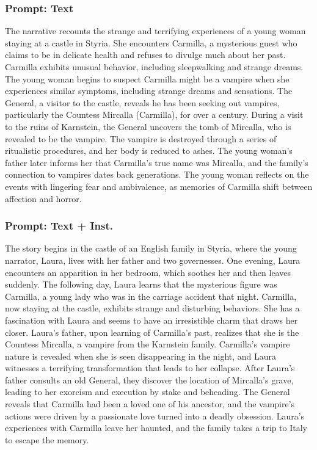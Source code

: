 \documentclass{article} %
\begin{document}
\subsubsection{Prompt: Text}

The narrative recounts the strange and terrifying experiences of a young woman staying at a castle in Styria. She encounters Carmilla, a mysterious guest who claims to be in delicate health and refuses to divulge much about her past. Carmilla exhibits unusual behavior, including sleepwalking and strange dreams. The young woman begins to suspect Carmilla might be a vampire when she experiences similar symptoms, including strange dreams and sensations. The General, a visitor to the castle, reveals he has been seeking out vampires, particularly the Countess Mircalla (Carmilla), for over a century. During a visit to the ruins of Karnstein, the General uncovers the tomb of Mircalla, who is revealed to be the vampire. The vampire is destroyed through a series of ritualistic procedures, and her body is reduced to ashes. The young woman's father later informs her that Carmilla's true name was Mircalla, and the family's connection to vampires dates back generations. The young woman reflects on the events with lingering fear and ambivalence, as memories of Carmilla shift between affection and horror.

\subsubsection{Prompt: Text + Inst.}

The story begins in the castle of an English family in Styria, where the young narrator, Laura, lives with her father and two governesses. One evening, Laura encounters an apparition in her bedroom, which soothes her and then leaves suddenly. The following day, Laura learns that the mysterious figure was Carmilla, a young lady who was in the carriage accident that night. Carmilla, now staying at the castle, exhibits strange and disturbing behaviors. She has a fascination with Laura and seems to have an irresistible charm that draws her closer. Laura's father, upon learning of Carmilla's past, realizes that she is the Countess Mircalla, a vampire from the Karnstein family. Carmilla's vampire nature is revealed when she is seen disappearing in the night, and Laura witnesses a terrifying transformation that leads to her collapse. After Laura's father consults an old General, they discover the location of Mircalla's grave, leading to her exorcism and execution by stake and beheading. The General reveals that Carmilla had been a loved one of his ancestor, and the vampire's actions were driven by a passionate love turned into a deadly obsession. Laura's experiences with Carmilla leave her haunted, and the family takes a trip to Italy to escape the memory.
\end{document}
